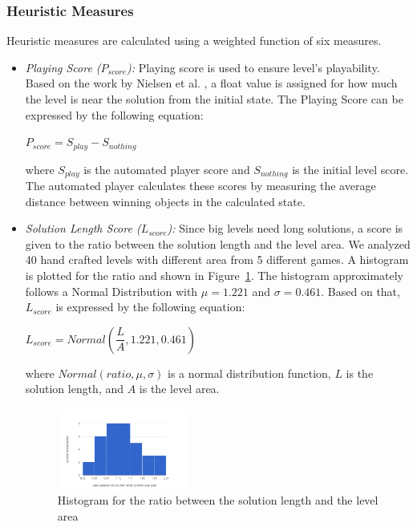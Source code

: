 \documentclass[letterpaper]{article}
\newcommand{\figref}[1]{Figure~\ref{Figure:#1}}
\begin{document}
\subsubsection{Heuristic Measures}
Heuristic measures are calculated using a weighted function of six measures.
\begin{itemize}
	\item \emph{Playing Score ($P_{score}$):} Playing score is used to ensure level's playability. Based on the work by Nielsen et al. \cite{gvgpPerformanceProfiles}, a float value is assigned for how much the level is near the solution from the initial state. The Playing Score can be expressed by the following equation:
	\begin{center}$ P_{score} = S_{play} - S_{nothing}$\end{center}
	where $S_{play}$ is the automated player score and $S_{nothing}$ is the initial level score. The automated player calculates these scores by measuring the average distance between winning objects in the calculated state.
	
	\item\emph{Solution Length Score ($L_{score}$):} Since big levels need long solutions, a score is given to the ratio between the solution length and the level area. We analyzed 40 hand crafted levels with different area from 5 different games. A histogram is plotted for the ratio and shown in \figref{solutionLengthHistogram}. The histogram approximately follows a Normal Distribution with $\mu = 1.221$ and $\sigma = 0.461$. Based on that, $L_{score}$ is expressed by the following equation:
	\begin{center}$L_{score} = Normal(\dfrac{L}{A}, 1.221, 0.461)$\end{center}
	where $Normal(ratio, \mu, \sigma)$ is a normal distribution function, $L$ is the solution length, and $A$ is the level area.
	\begin{figure}[ht]
		\centering
		\includegraphics[width=0.4\textwidth]{Images/solutionLengthHistogram}
		\caption{Histogram for the ratio between the solution length and the level area}
		\label{Figure:solutionLengthHistogram}
	\end{figure}
	

\end{itemize}
\end{document}

